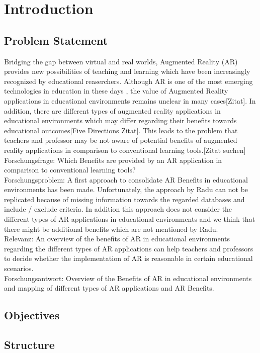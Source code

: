 \section{Introduction}
\subsection{Problem Statement}
Bridging the gap between virtual and real worlds, Augmented Reality (AR) provides new possibilities of teaching and learning which have been increasingly recognized by educational reaserchers. \autocite [cf.][41]{Wu.2013} Although AR is one of the most emerging technologies in education in these days \autocite [cf.]{Johnson.2010}, the value of Augmented Reality applications in educational environments remains unclear in many cases[Zitat]. In addition, there are different types of augmented reality applications in educational environments which may differ regarding their benefits towards educational outcomes[Five Directions Zitat]. This leads to the problem that teachers and professor may be not aware of potential benefits of augmented reality applications in comparison to conventional learning tools.[Zitat suchen]\\
Forschungsfrage: Which Benefits are provided by an AR application in comparison to conventional learning tools? \\
Forschungsproblem: A first approach to consolidate AR Benefits in educational environments has been made. Unfortunately, the approach by Radu can not be replicated because of missing information towards the regarded databases and include / exclude criteria. In addition this approach does not consider the different types of AR applications in educational environments and we think that there might be additional benefits which are not mentioned by Radu.\\
Relevanz: An overview of the benefits of AR in educational environments regarding the different types of AR applications can help teachers and professors to decide whether the implementation of AR is reasonable in certain educational scenarios.\\
Forschungsantwort: Overview of the Benefits of AR in educational environments and mapping of different types of AR applications and AR Benefits.

\subsection{Objectives}
\subsection{Structure}